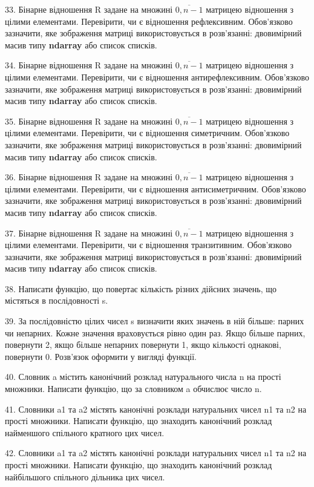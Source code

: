 \documentclass[10pt, ukrainian]{article}
\begin{document}
{\begin {Large}
33. Бінарне відношення R задане на множині $\overline{0,n-1}$ матрицею відношення з цілими елементами.  Перевірити, чи є відношення рефлексивним. Обов'язково зазначити, яке зображення матриці використовується в розв'язанні: двовимірний масив типу \textbf{ndarray} або список списків.

34. Бінарне відношення R задане на множині $\overline{0,n-1}$ матрицею відношення з цілими елементами.  Перевірити, чи є відношення антирефлексивним. Обов'язково зазначити, яке зображення матриці використовується в розв'язанні: двовимірний масив типу \textbf{ndarray} або список списків.

35. Бінарне відношення R задане на множині $\overline{0,n-1}$ матрицею відношення з цілими елементами.  Перевірити, чи є відношення симетричним. Обов'язково зазначити, яке зображення матриці використовується в розв'язанні: двовимірний масив типу \textbf{ndarray} або список списків.

\newpage

36. Бінарне відношення R задане на множині $\overline{0,n-1}$ матрицею відношення з цілими елементами.  Перевірити, чи є відношення антисиметричним. Обов'язково зазначити, яке зображення матриці використовується в розв'язанні: двовимірний масив типу \textbf{ndarray} або список списків.

37. Бінарне відношення R задане на множині $\overline{0,n-1}$ матрицею відношення з цілими елементами.  Перевірити, чи є відношення транзитивним. Обов'язково зазначити, яке зображення матриці використовується в розв'язанні: двовимірний масив типу \textbf{ndarray} або список списків.

38. Написати функцію, що повертає кількість різних дійсних значень, що містяться в послідовності s.

39. За послідовністю цілих чисел s визначити яких значень в ній більше: парних чи непарних. Кожне значення враховується рівно один раз. Якщо більше парних, повернути 2, якщо більше непарних повернути 1, якщо кількості однакові, повернути 0. Розв’язок оформити у вигляді функції.

40. Словник a містить канонічний розклад натурального числа n на прості множники. Написати функцію, що за словником a обчислює число n.

41. Словники a1 та a2 містять канонічні розклади натуральних чисел n1 та n2 на прості множники. Написати функцію, що знаходить канонічний розклад найменшого спільного кратного цих чисел.

42. Словники a1 та a2 містять канонічні розклади натуральних чисел n1 та n2 на прості множники. Написати функцію, що знаходить канонічний розклад найбільшого спільного дільника цих чисел.


\end{Large}}
\end{document}
